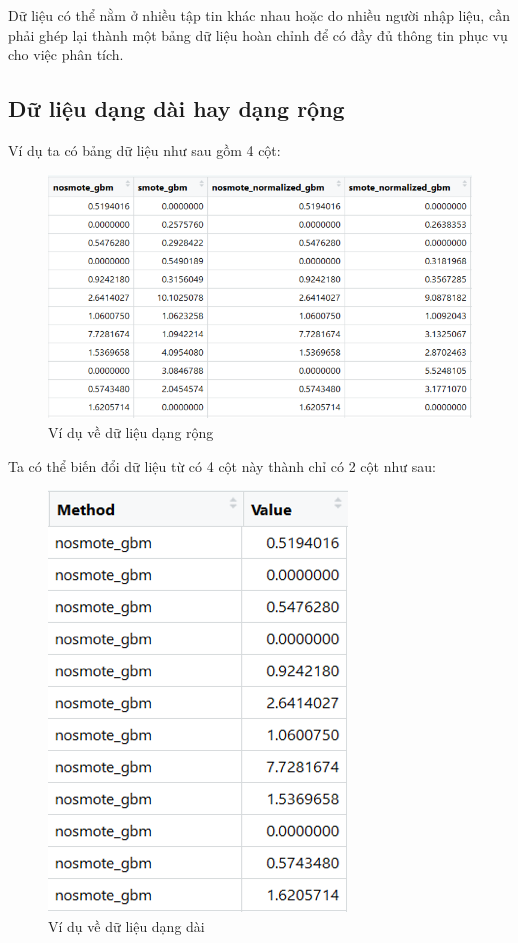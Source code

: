 \documentclass[]{tufte-book}
\begin{document}
Dữ liệu có thể nằm ở nhiều tập tin khác nhau hoặc do nhiều người nhập liệu, cần phải ghép lại thành một bảng dữ liệu hoàn chỉnh để có đầy đủ thông tin phục vụ cho việc phân tích.

\hypertarget{d-liu-dang-dai-hay-dang-rng}{%
\subsection{Dữ liệu dạng dài hay dạng rộng}\label{d-liu-dang-dai-hay-dang-rng}}

Ví dụ ta có bảng dữ liệu như sau gồm 4 cột:

\begin{figure}
\centering
\includegraphics{figures/02_05.png}
\caption{Ví dụ về dữ liệu dạng rộng}
\end{figure}

Ta có thể biến đổi dữ liệu từ có 4 cột này thành chỉ có 2 cột như sau:

\begin{figure}
\centering
\includegraphics{figures/02_06.png}
\caption{Ví dụ về dữ liệu dạng dài}
\end{figure}
\end{document}
